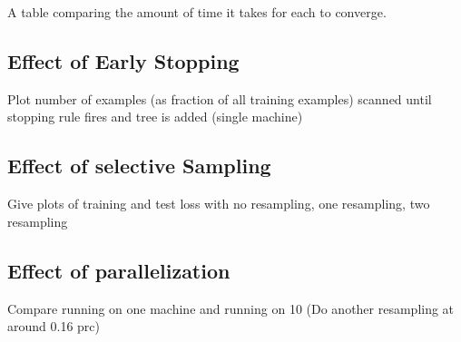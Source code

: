 A table comparing the amount of time it takes for each to converge.

\subsection{Effect of Early Stopping}
Plot number of examples (as fraction of all training examples) scanned until stopping rule fires and  tree is added (single machine)

\subsection{Effect of selective Sampling}
Give plots of training and test loss with no resampling, one resampling, two resampling

\subsection{Effect of parallelization}
Compare running on one machine and running on 10 (Do another resampling at around 0.16 prc)



\fi
